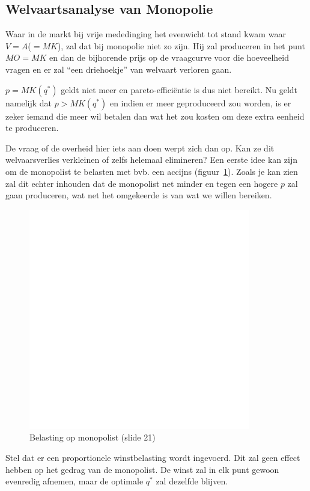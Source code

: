 \subsection{Welvaartsanalyse van Monopolie}
Waar in de markt bij vrije mededinging het evenwicht tot stand kwam waar $V=A$($=MK$), zal dat bij monopolie niet zo zijn. Hij zal produceren in het punt $MO=MK$ en dan de bijhorende prijs op de vraagcurve voor die hoeveelheid vragen en er zal ``een driehoekje'' van welvaart verloren gaan.

$p=MK(q^*)$ geldt niet meer en pareto-effici\"entie is dus niet bereikt. Nu geldt namelijk dat $p>MK(q^*)$ en indien er meer geproduceerd zou worden, is er zeker iemand die meer wil betalen dan wat het zou kosten om deze extra eenheid te produceren.

De vraag of de overheid hier iets aan doen werpt zich dan op. Kan ze dit welvaarsverlies verkleinen of zelfs helemaal elimineren? Een eerste idee kan zijn om de monopolist te belasten met bvb. een accijns (figuur~\ref{fig:belastingOpMonopolist}). Zoals je kan zien zal dit echter inhouden dat de monopolist net minder en tegen een hogere $p$ zal gaan produceren, wat net het omgekeerde is van wat we willen bereiken.
\begin{figure}[htbp]
   \centering
   \includegraphics[scale=0.4]{Images/white.png}
   \caption{Belasting op monopolist (slide 21)}
   \label{fig:belastingOpMonopolist}
\end{figure}

Stel dat er een proportionele winstbelasting wordt ingevoerd. Dit zal geen effect hebben op het gedrag van de monopolist. De winst zal in elk punt gewoon evenredig afnemen, maar de optimale $q^*$ zal dezelfde blijven.

